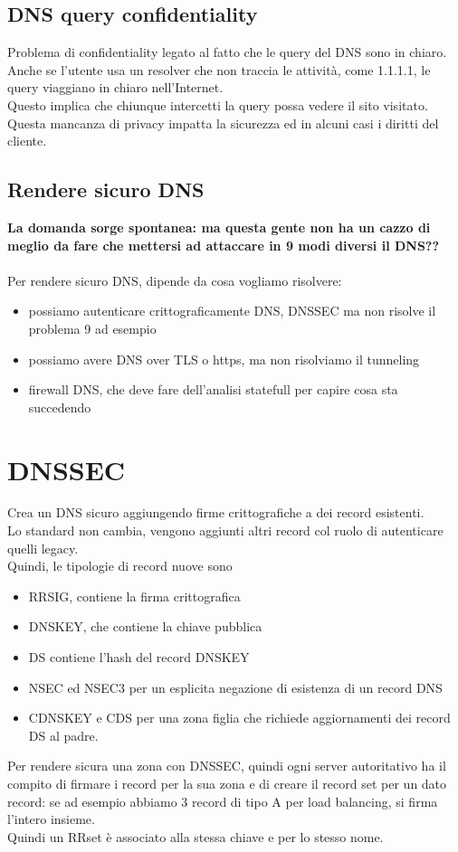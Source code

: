 \documentclass[12pt, oneside]{extbook} %
\begin{document}
\subsection{DNS query confidentiality}
Problema di confidentiality legato al fatto che le query del DNS sono in chiaro.
\\Anche se l'utente usa un resolver che non traccia le attività, come 1.1.1.1, le query viaggiano in chiaro nell'Internet.
\\Questo implica che chiunque intercetti la query possa vedere il sito visitato.
\\Questa mancanza di privacy impatta la sicurezza ed in alcuni casi i diritti del cliente.

\subsection{Rendere sicuro DNS}
\textbf{\Huge La domanda sorge spontanea: ma questa gente non ha un cazzo di meglio da fare che mettersi ad attaccare in 9 modi diversi il DNS??}
\\\\Per rendere sicuro DNS, dipende da cosa vogliamo risolvere:
\begin{itemize}
	\item possiamo autenticare crittograficamente DNS, DNSSEC ma non risolve il problema 9 ad esempio
	\item possiamo avere DNS over TLS o https, ma non risolviamo il tunneling
	\item firewall DNS, che deve fare dell'analisi statefull per capire cosa sta succedendo
\end{itemize}

\section{DNSSEC}
Crea un DNS sicuro aggiungendo firme crittografiche a dei record esistenti.
\\Lo standard non cambia, vengono aggiunti altri record col ruolo di autenticare quelli legacy.
\\Quindi, le tipologie di record nuove sono
\begin{itemize}
	\item RRSIG, contiene la firma crittografica
	\item DNSKEY, che contiene la chiave pubblica 
	\item DS contiene l'hash del record DNSKEY
    \item NSEC ed NSEC3 per un esplicita negazione di esistenza di un record DNS
    \item CDNSKEY e CDS per una zona figlia che richiede aggiornamenti dei record DS al padre.
\end{itemize}
Per rendere sicura una zona con DNSSEC, quindi ogni server autoritativo ha il compito di firmare i record per la sua zona e di creare il record set per un dato record: se ad esempio abbiamo 3 record di tipo A per load balancing, si firma l'intero insieme.
\\Quindi un RRset è associato alla stessa chiave e per lo stesso nome.
\end{document}
